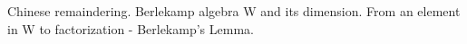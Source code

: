 
\noindent

Chinese remaindering. Berlekamp algebra W and its dimension. From an element in W to factorization - Berlekamp's Lemma.
